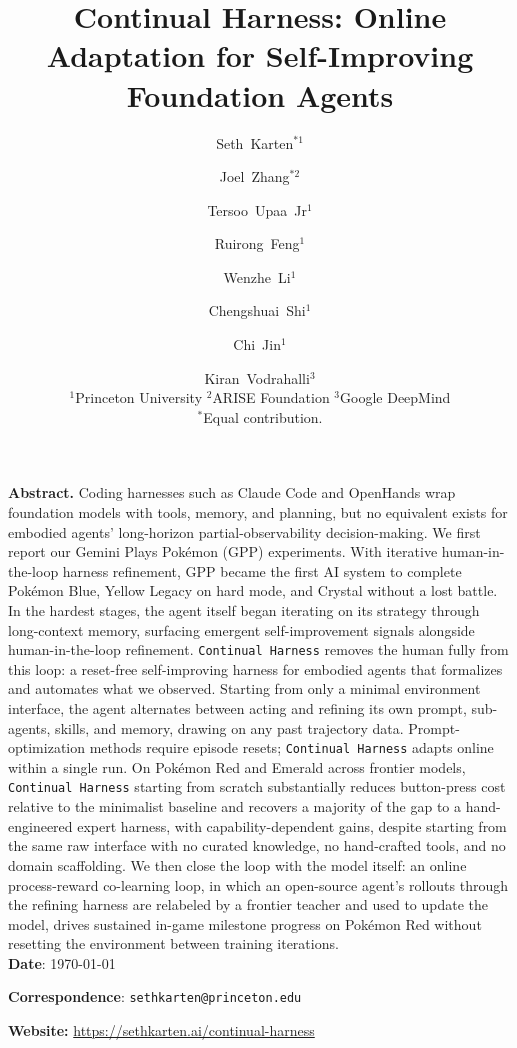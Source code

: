\documentclass[11pt]{article}
\title{Continual Harness: Online Adaptation for Self-Improving Foundation Agents}
\author{Seth~Karten$^{*1}$ \and Joel~Zhang$^{*2}$ \and Tersoo~Upaa~Jr$^{1}$ \and Ruirong~Feng$^{1}$ \and Wenzhe~Li$^{1}$ \and Chengshuai~Shi$^{1}$ \and Chi~Jin$^{1}$ \and Kiran~Vodrahalli$^{3}$\\[0.3em]
  \small $^{1}$Princeton University \quad $^{2}$ARISE Foundation \quad $^{3}$Google DeepMind\\[0.2em]
  \small $^{*}$Equal contribution.}
\date{\vspace{0pt}}
\newcommand{\titleskip}{0.8em}
\begin{document}
\thispagestyle{empty}
\maketitle

\pagestyle{fancy}

\begin{tcolorbox}[
  colback       = LightGrey,
  colframe      = AccentColor!80!black,
  boxrule       = 0pt,
  arc           = 2pt,
  before skip   = 0pt,
  after skip    = \titleskip
  ]
\noindent\textbf{Abstract.} Coding harnesses such as Claude Code and OpenHands wrap foundation models with tools, memory, and planning, but no equivalent exists for embodied agents' long-horizon partial-observability decision-making. We first report our Gemini Plays Pok\'emon (GPP) experiments. With iterative human-in-the-loop harness refinement, GPP became the first AI system to complete Pok\'emon Blue, Yellow Legacy on hard mode, and Crystal without a lost battle. In the hardest stages, the agent itself began iterating on its strategy through long-context memory, surfacing emergent self-improvement signals alongside human-in-the-loop refinement. \texttt{Continual Harness} removes the human fully from this loop: a reset-free self-improving harness for embodied agents that formalizes and automates what we observed. Starting from only a minimal environment interface, the agent alternates between acting and refining its own prompt, sub-agents, skills, and memory, drawing on any past trajectory data. Prompt-optimization methods require episode resets; \texttt{Continual Harness} adapts online within a single run. On Pok\'emon Red and Emerald across frontier models, \texttt{Continual Harness} starting from scratch substantially reduces button-press cost relative to the minimalist baseline and recovers a majority of the gap to a hand-engineered expert harness, with capability-dependent gains, despite starting from the same raw interface with no curated knowledge, no hand-crafted tools, and no domain scaffolding. We then close the loop with the model itself: an online process-reward co-learning loop, in which an open-source agent's rollouts through the refining harness are relabeled by a frontier teacher and used to update the model, drives sustained in-game milestone progress on Pok\'emon Red without resetting the environment between training iterations.
\\

\textbf{Date}: \today

\textbf{Correspondence}: \texttt{sethkarten@princeton.edu}

\textbf{Website:} \url{https://sethkarten.ai/continual-harness}
\end{tcolorbox}
\end{document}
